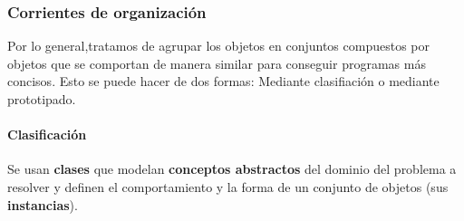 \subsubsection{Corrientes de organización}
Por lo general,tratamos de agrupar los objetos en conjuntos compuestos por objetos que se comportan de manera similar para conseguir programas más concisos. Esto se puede hacer de dos formas: Mediante clasifiación o mediante prototipado.

\paragraph{Clasificación} Se usan \textbf{clases} que modelan \textbf{conceptos abstractos} del dominio del problema a resolver y definen el comportamiento y la forma de un conjunto de objetos (sus \textbf{instancias}).